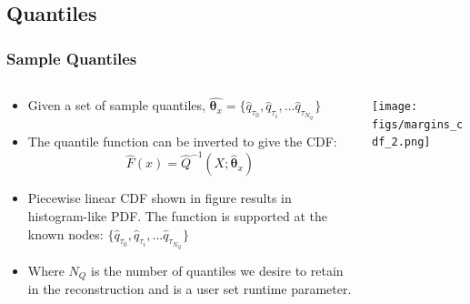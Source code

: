 \documentclass[t, pdftex]{beamer}
\begin{document}
\subsection*{Quantiles}
\begin{frame}
\frametitle{Sample Quantiles}
\vspace{-15pt}
    \begin{columns}
        \begin{column}{0.5\textwidth}
            \scriptsize{
                \begin{itemize}
                    \item Given a set of sample quantiles, $\hat{\mathbf{\theta}_x} = \{\hat q_{\tau_0}, \hat q_{\tau_i}, ... \hat{q}_{\tau_{N_Q}} \}$
                    \item The quantile function can be inverted to give the CDF:
                    \[
                    \hat F(x) = \hat{Q}^{-1}(X; \mathbf{\hat \theta}_x)
                    \]
                    \item Piecewise linear CDF shown in figure results in histogram-like PDF.  The function is supported at the known nodes: $\{ \hat q_{\tau_0}, \hat q_{\tau_i}, ... \hat q_{\tau_{N_Q}} \}$
                    \item Where $N_{Q}$ is the number of quantiles we desire to retain in the reconstruction and is a user set runtime parameter.
                \end{itemize}
            }
        \end{column}
        \begin{column}{0.5\textwidth}  %
            \begin{center}
                \texttt{[image: figs/margins\_cdf\_2.png]}
            \end{center}
        \end{column}
    \end{columns}
\end{frame}

\end{document}
